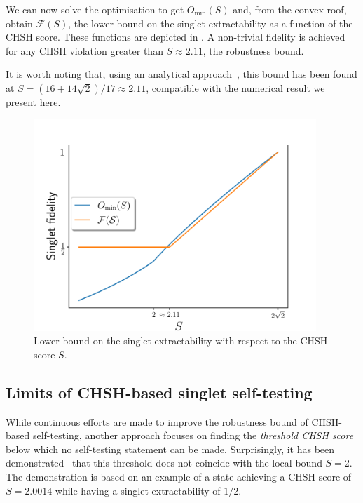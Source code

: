 We can now solve the optimisation  to get $O_{\min}(S)$ and, from the convex roof, obtain $\mathcal{F}(S)$, the lower bound on the singlet extractability as a function of the CHSH score.
These functions are depicted in .
A non-trivial fidelity is achieved for any CHSH violation greater than $S \approx 2.11$, the robustness bound. 

It is worth noting that, using an analytical approach~\cite{Kaniewski2016}, this bound has been found at $S=(16+14\sqrt{2})/17\approx2.11$, compatible with the numerical result we present here.

\begin{figure}
	\begin{center}
		\includegraphics[width=0.95\textwidth]{chapters/selftesting/img/fidCHSH.pdf}
	\end{center}
	\caption{Lower bound on the singlet extractability with respect to the CHSH score $S$.}
	\label{fig:fidCHSH}
\end{figure}

\subsection{Limits of CHSH-based singlet self-testing}
\label{sec:robust_limits}

While continuous efforts are made to improve the robustness bound of CHSH-based self-testing, another approach focuses on finding the \textit{threshold CHSH score} below which no self-testing statement can be made.
Surprisingly, it has been demonstrated~\cite{Coopmans19} that this threshold does not coincide with the local bound $S=2$.
The demonstration is based on an example of a state achieving a CHSH score of $S=2.0014$ while having a singlet extractability of $1/2$.

